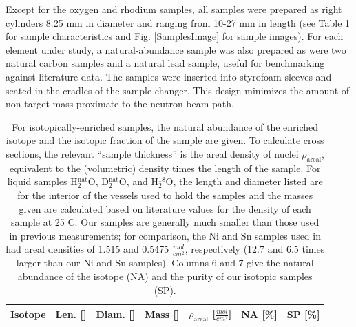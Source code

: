 \documentclass[twocolumn,secnumarabic,amssymb, nobibnotes, aps, prl,
superscriptaddress, nobalancelastpage]{revtex4}
\newcommand{\tot}{\ensuremath{\sigma_{tot}}}
\begin{document}
Except for the oxygen and rhodium samples, all samples were prepared as right
cylinders 8.25 mm in diameter and ranging from 10-27 mm in length (see
Table \ref{SampleCharacteristics} for sample characteristics and Fig. \ref{SamplesImage}
for sample images). For each element under study, a natural-abundance sample
was also prepared as were two natural carbon
samples and a natural lead sample, useful for benchmarking against
literature data. The samples
were inserted into styrofoam sleeves and seated in the cradles of the sample
changer. This design minimizes the amount of non-target mass proximate to the
neutron beam path.

\begin{table}[tb]
    \caption[Physical characteristics of samples used for neutron \tot\
    measurements]
    {
        For isotopically-enriched samples, the natural abundance
        of the enriched isotope and the isotopic fraction of the sample are
        given. To calculate cross sections, the relevant ``sample thickness'' is the areal
        density of nuclei $\rho_{\text{areal}}$, equivalent to
        the (volumetric) density times the length of the sample. For liquid
        samples H$_{2}^{\text{nat}}$O, D$_{2}^{\text{nat}}$O, and H$_{2}^{18}$O,
        the length and diameter listed are for the interior of the vessels
        used to hold the samples and the masses given are calculated based on 
        literature values for the density of each sample at 25 C.
        Our samples are generally much smaller than those used in previous
        measurements; for comparison, the Ni and Sn samples used in \cite{Abfalterer2001,
        Finlay1993} had areal densities of 1.515 and 0.5475
        $\frac{mol}{cm^{2}}$, respectively (12.7 and 6.5 times larger than our
        Ni and Sn samples). Columns 6 and 7 give the natural abundance of the
        isotope (NA) and the purity of our isotopic samples (SP).
    }
    \label{SampleCharacteristics}
    \begin{center}
        \begin{tabular}{ c c c c c c c }
            \hline
            Isotope & Len. [\milli\meter] & Diam. [\milli\meter]
            & Mass [\gram] & $\rho_{\text{areal}}$
            [$\frac{mol}{cm^{2}}$] & NA [\%] & SP 
            [\%]\\
            \hline


\end{tabular}
\end{center}
\end{table}
\end{document}

